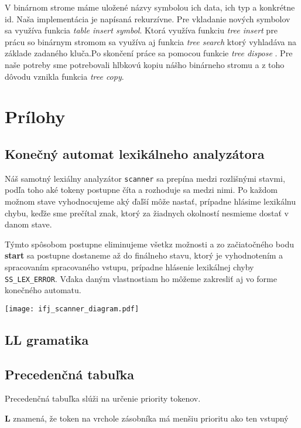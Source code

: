 \documentclass[12pt, a4paper]{article}
\begin{document}
				V binárnom strome máme uložené názvy symbolou ich data, ich typ a konkrétne id. Naša implementácia je napísaná rekurzívne. Pre vkladanie nových symbolov sa využíva funkcia \textit{table insert symbol}. Ktorá využíva funkciu \textit{tree insert} pre prácu so binárnym stromom sa využíva aj funkcia \textit{tree search} ktorý vyhladáva na základe zadaného kluča.Po skončení práce sa pomocou funkcie \textit{tree dispose} . Pre naše potreby sme potrebovali hlbkovú kopiu nášho binárneho stromu a z toho dôvodu vznikla funkcia \textit{tree copy}.
	\section{Prílohy}
        \subsection{Konečný automat lexikálneho analyzátora} \label{sec:KA}
        Náš samotný lexiálny analyzátor \texttt{scanner} sa prepína medzi rozlišnými stavmi, podľa toho aké tokeny postupne číta a rozhoduje sa medzi nimi. Po každom možnom stave vyhodnocujeme aký ďaľší môže nastať, prípadne hlásime lexikálnu chybu, keďže sme prečítal znak, ktorý za žiadnych okolností nesmieme dostať v danom stave.

        Týmto spôsobom postupne eliminujeme všetkz možnosti a zo začiatočného bodu \textbf{start} sa postupne dostaneme až do finálneho stavu, ktorý je vyhodnotením a spracovaním spracovaného vstupu, prípadne hlásenie lexikálnej chyby \verb|SS_LEX_ERROR|. Vďaka daným vlastnostiam ho môžeme zakresliť aj vo forme konečného automatu.

	    \begin{center}
	    	\texttt{[image: ifj\_scanner\_diagram.pdf]}
	    \end{center}

        \subsection{LL gramatika}

        \subsection{Precedenčná tabuľka} \label{sec:tab}
        Precedenčná tabuľka slúži na určenie priority tokenov.

        \textbf{L} znamená, že token na vrchole zásobníka má menšiu prioritu ako ten vstupný
\end{document}
